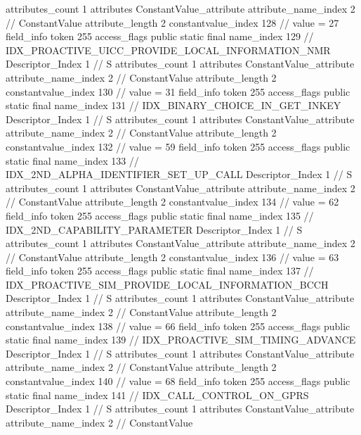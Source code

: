 {{{{{				attributes_count	1
				attributes {
				ConstantValue_attribute {
					attribute_name_index	2		// ConstantValue
					attribute_length	2
					constantvalue_index	128		// value = 27
				}
				}
			}
			field_info {
				token	255
				access_flags	public static final
				name_index	129		// IDX_PROACTIVE_UICC_PROVIDE_LOCAL_INFORMATION_NMR
				Descriptor_Index	1		// S
				attributes_count	1
				attributes {
				ConstantValue_attribute {
					attribute_name_index	2		// ConstantValue
					attribute_length	2
					constantvalue_index	130		// value = 31
				}
				}
			}
			field_info {
				token	255
				access_flags	public static final
				name_index	131		// IDX_BINARY_CHOICE_IN_GET_INKEY
				Descriptor_Index	1		// S
				attributes_count	1
				attributes {
				ConstantValue_attribute {
					attribute_name_index	2		// ConstantValue
					attribute_length	2
					constantvalue_index	132		// value = 59
				}
				}
			}
			field_info {
				token	255
				access_flags	public static final
				name_index	133		// IDX_2ND_ALPHA_IDENTIFIER_SET_UP_CALL
				Descriptor_Index	1		// S
				attributes_count	1
				attributes {
				ConstantValue_attribute {
					attribute_name_index	2		// ConstantValue
					attribute_length	2
					constantvalue_index	134		// value = 62
				}
				}
			}
			field_info {
				token	255
				access_flags	public static final
				name_index	135		// IDX_2ND_CAPABILITY_PARAMETER
				Descriptor_Index	1		// S
				attributes_count	1
				attributes {
				ConstantValue_attribute {
					attribute_name_index	2		// ConstantValue
					attribute_length	2
					constantvalue_index	136		// value = 63
				}
				}
			}
			field_info {
				token	255
				access_flags	public static final
				name_index	137		// IDX_PROACTIVE_SIM_PROVIDE_LOCAL_INFORMATION_BCCH
				Descriptor_Index	1		// S
				attributes_count	1
				attributes {
				ConstantValue_attribute {
					attribute_name_index	2		// ConstantValue
					attribute_length	2
					constantvalue_index	138		// value = 66
				}
				}
			}
			field_info {
				token	255
				access_flags	public static final
				name_index	139		// IDX_PROACTIVE_SIM_TIMING_ADVANCE
				Descriptor_Index	1		// S
				attributes_count	1
				attributes {
				ConstantValue_attribute {
					attribute_name_index	2		// ConstantValue
					attribute_length	2
					constantvalue_index	140		// value = 68
				}
				}
			}
			field_info {
				token	255
				access_flags	public static final
				name_index	141		// IDX_CALL_CONTROL_ON_GPRS
				Descriptor_Index	1		// S
				attributes_count	1
				attributes {
				ConstantValue_attribute {
					attribute_name_index	2		// ConstantValue
}}}}}}}
